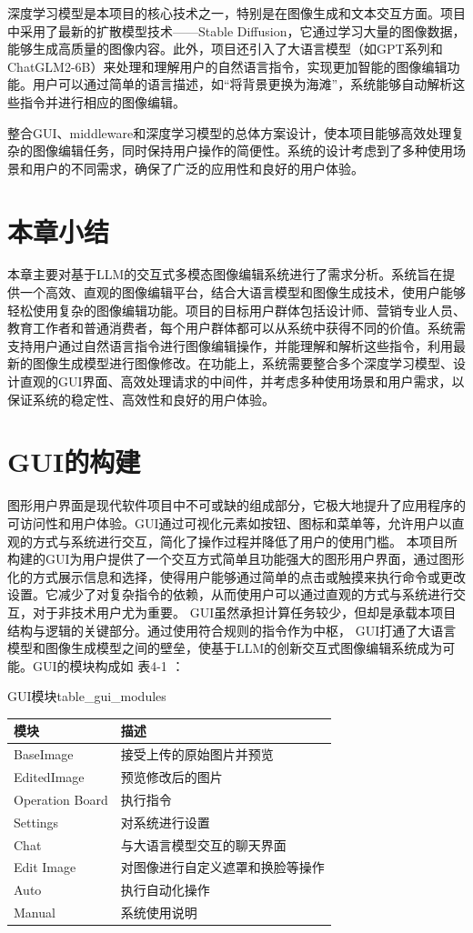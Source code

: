 \documentclass[a4paper,AutoFakeBold,oneside,12pt]{book}
\begin{document}
深度学习模型是本项目的核心技术之一，特别是在图像生成和文本交互方面。项目中采用了最新的扩散模型技术——Stable Diffusion，它通过学习大量的图像数据，能够生成高质量的图像内容。此外，项目还引入了大语言模型（如GPT系列和ChatGLM2-6B）来处理和理解用户的自然语言指令，实现更加智能的图像编辑功能。用户可以通过简单的语言描述，如“将背景更换为海滩”，系统能够自动解析这些指令并进行相应的图像编辑。

整合GUI、middleware和深度学习模型的总体方案设计，使本项目能够高效处理复杂的图像编辑任务，同时保持用户操作的简便性。系统的设计考虑到了多种使用场景和用户的不同需求，确保了广泛的应用性和良好的用户体验。

\section{本章小结}
本章主要对基于LLM的交互式多模态图像编辑系统进行了需求分析。系统旨在提供一个高效、直观的图像编辑平台，结合大语言模型和图像生成技术，使用户能够轻松使用复杂的图像编辑功能。项目的目标用户群体包括设计师、营销专业人员、教育工作者和普通消费者，每个用户群体都可以从系统中获得不同的价值。系统需支持用户通过自然语言指令进行图像编辑操作，并能理解和解析这些指令，利用最新的图像生成模型进行图像修改。在功能上，系统需要整合多个深度学习模型、设计直观的GUI界面、高效处理请求的中间件，并考虑多种使用场景和用户需求，以保证系统的稳定性、高效性和良好的用户体验。

\section{GUI的构建} %
图形用户界面是现代软件项目中不可或缺的组成部分，它极大地提升了应用程序的可访问性和用户体验。GUI通过可视化元素如按钮、图标和菜单等，允许用户以直观的方式与系统进行交互，简化了操作过程并降低了用户的使用门槛。
本项目所构建的GUI为用户提供了一个交互方式简单且功能强大的图形用户界面，通过图形化的方式展示信息和选择，使得用户能够通过简单的点击或触摸来执行命令或更改设置。它减少了对复杂指令的依赖，从而使用户可以通过直观的方式与系统进行交互，对于非技术用户尤为重要。
GUI虽然承担计算任务较少，但却是承载本项目结构与逻辑的关键部分。通过使用符合规则的指令作为中枢，
GUI打通了大语言模型和图像生成模型之间的壁垒，使基于LLM的创新交互式图像编辑系统成为可能。GUI的模块构成如 表4-1 ：
\begin{bupttable}{GUI模块}{table_gui_modules}
    \begin{tabular}{|l|l|}
        \hline \textbf{模块} & \textbf{描述} \\
        \hline BaseImage & 接受上传的原始图片并预览  \\
        \hline EditedImage & 预览修改后的图片 \\
        \hline Operation Board & 执行指令  \\
		\hline Settings & 对系统进行设置  \\
		\hline Chat & 与大语言模型交互的聊天界面  \\
		\hline Edit Image & 对图像进行自定义遮罩和换脸等操作  \\
		\hline Auto & 执行自动化操作  \\
		\hline Manual & 系统使用说明  \\
        \hline
    \end{tabular}
\end{bupttable}
\end{document}
